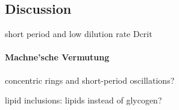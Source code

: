\documentclass[11pt,a4paper,english]{article}
\begin{document}
\subsection{Discussion}

short period and low dilution rate Dcrit

\paragraph{Machne'sche Vermutung}

concentric rings and short-period oscillations?

lipid inclusions: lipids instead of glycogen?


\setlength{\bibsep}{0pt plus 0.3ex}

\end{document}
